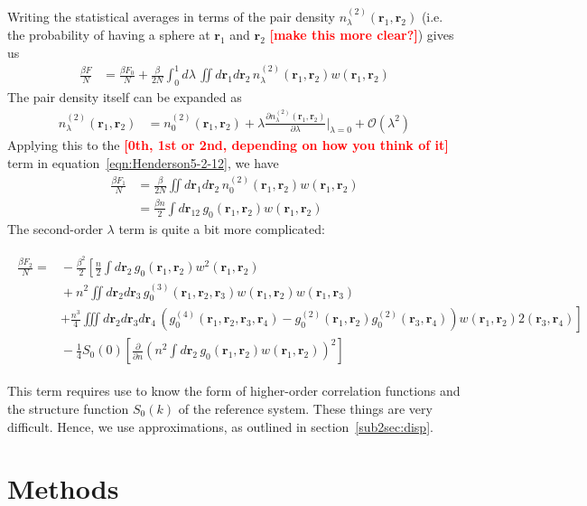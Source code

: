 \documentclass[letterpaper,twocolumn,amsmath,amssymb,prb]{revtex4-1}
\newcommand{\1}{\ensuremath{\textbf{r}_1}}
\newcommand{\2}{\ensuremath{\textbf{r}_2}}
\newcommand{\3}{\ensuremath{\textbf{r}_3}}
\newcommand{\4}{\ensuremath{\textbf{r}_4}}
\newcommand{\fixme}[1]{\textcolor{red}{\textbf{[#1]}}}
\begin{document}
Writing the statistical averages in terms of the pair density $n_\lambda^{(2)}(\1,\2)$ (i.e. the probability of having a sphere at \1 and \2 \fixme{make this more clear?}) gives us
\begin{align}
  \frac{\beta F}{N} &= \frac{\beta F_0}{N} + \frac{\beta}{2N}\int_0^1 d\lambda\, \iint d\1 d\2\, n_\lambda^{(2)}(\1,\2)w(\1,\2) \label{eqn:Henderson5-2-12}
\end{align}
The pair density itself can be expanded as
\begin{align}
  n_\lambda^{(2)}(\1,\2) &= n_0^{(2)}(\1,\2) + \lambda\frac{\partial n_\lambda^{(2)}(\1,\2)}{\partial\lambda}\bigg|_{\lambda = 0} + \mathcal{O}(\lambda^2)
\end{align}
Applying this to the \fixme{0th, 1st or 2nd, depending on how you think of it} term in equation~\ref{eqn:Henderson5-2-12}, we have
\begin{align}
  \frac{\beta F_1}{N} &= \frac{\beta}{2N}\iint d\1 d\2\, n_0^{(2)}(\1,\2)w(\1,\2) \\
  &= \frac{\beta n}{2}\int d\mathbf{r}_{12}\, g_0(\1,\2)w(\1,\2)
\end{align}
The second-order $\lambda$ term is quite a bit more complicated:
\begin{widetext}
 \begin{align}
   \begin{split}
   \frac{\beta F_2}{N} =&{} -\frac{\beta^2}{2}\left[ \frac{n}{2}\int d\2\, g_0(\1,\2)w^2(\1,\2) \right. \\ &{} + n^2 \iint d\2 d\3\, g_0^{(3)}(\1,\2,\3)w(\1,\2)w(\1,\3) \\ &{} \left. + \frac{n^3}{4}\iiint d\2 d\3 d\4\, \left( g_0^{(4)}(\1,\2,\3,\4) - g_0^{(2)}(\1,\2)g_0^{(2)}(\3,\4) \right)w(\1,\2)2(\3,\4) \right] \\ &{} - \frac{1}{4}S_0(0)\left[ \frac{\partial}{\partial n}\left( n^2\int d\2\, g_0(\1,\2)w(\1,\2) \right)^2 \right]
   \end{split}
 \end{align}
\end{widetext}
This term requires use to know the form of higher-order correlation functions and the structure function $S_0(k)$ of the reference system. These things are very difficult. Hence, we use approximations, as outlined in section~\ref{sub2sec:disp}.

\section{Methods}\label{sec:methods}
\end{document}
